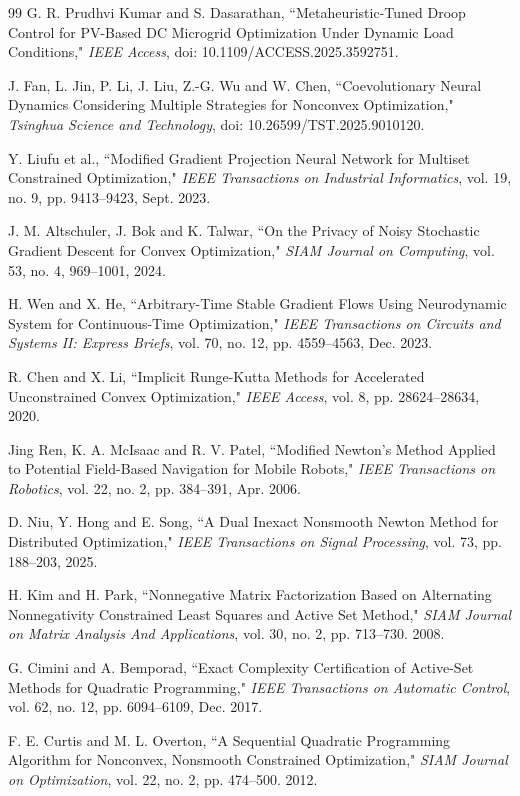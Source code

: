 \documentclass[fleqn,10pt]{wlscirep}
\begin{document}
\begin{thebibliography}{99}
 G. R. Prudhvi Kumar and S. Dasarathan, ``Metaheuristic-Tuned Droop Control for PV-Based DC Microgrid Optimization Under Dynamic Load Conditions," \emph{IEEE Access}, doi: 10.1109/ACCESS.2025.3592751.


 J. Fan, L. Jin, P. Li, J. Liu, Z.-G. Wu and W. Chen, ``Coevolutionary Neural Dynamics Considering Multiple Strategies for Nonconvex Optimization," \emph{Tsinghua Science and Technology}, doi: 10.26599/TST.2025.9010120.

  Y. Liufu et al., ``Modified Gradient Projection Neural Network for Multiset Constrained Optimization,"  \emph{IEEE Transactions on Industrial Informatics}, vol. 19, no. 9, pp. 9413--9423, Sept. 2023.


 J. M. Altschuler, J. Bok and K. Talwar, ``On the Privacy of Noisy Stochastic Gradient Descent for Convex Optimization," \emph{SIAM Journal on Computing}, vol. 53, no. 4, 969--1001, 2024.

 H. Wen and X. He, ``Arbitrary-Time Stable Gradient Flows Using Neurodynamic System for Continuous-Time Optimization," \emph{IEEE Transactions on Circuits and Systems II: Express Briefs}, vol. 70, no. 12, pp. 4559--4563, Dec. 2023.

 R. Chen and X. Li, ``Implicit Runge-Kutta Methods for Accelerated Unconstrained Convex Optimization," \emph{IEEE Access}, vol. 8, pp. 28624--28634, 2020.

 Jing Ren, K. A. McIsaac and R. V. Patel, ``Modified Newton's Method Applied to Potential Field-Based Navigation for Mobile Robots," \emph{IEEE Transactions on Robotics}, vol. 22, no. 2, pp. 384--391, Apr. 2006.


 D. Niu, Y. Hong and E. Song, ``A Dual Inexact Nonsmooth Newton Method for Distributed Optimization," \emph{IEEE Transactions on Signal Processing}, vol. 73, pp. 188--203, 2025.


 H. Kim and H. Park, ``Nonnegative Matrix Factorization Based on Alternating Nonnegativity Constrained Least Squares and Active Set Method," \emph{SIAM Journal on Matrix Analysis And Applications}, vol. 30, no. 2, pp. 713--730. 2008.

 G. Cimini and A. Bemporad, ``Exact Complexity Certification of Active-Set Methods for Quadratic Programming," \emph{IEEE Transactions on Automatic Control}, vol. 62, no. 12, pp. 6094--6109, Dec. 2017.


 F. E. Curtis and M. L. Overton, ``A Sequential Quadratic Programming Algorithm for Nonconvex, Nonsmooth Constrained Optimization," \emph{SIAM Journal on Optimization}, vol. 22, no. 2, pp. 474--500. 2012.


\end{thebibliography}
\end{document}
